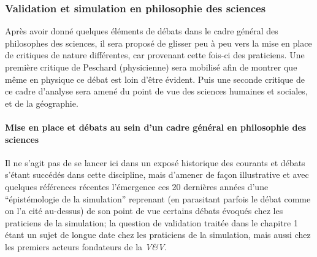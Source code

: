 \subsubsection{Validation et simulation en philosophie des sciences}
\label{sssec:philo_sciences}


Après avoir donné quelques éléments de débats dans le cadre général des philosophes des sciences, il sera proposé de glisser peu à peu vers la mise en place de critiques de nature différentes, car provenant cette fois-ci des praticiens. Une première critique de Peschard (physicienne) \autocite{Peschard2013} sera mobilisé afin de montrer que même en physique ce débat est loin d'être évident. Puis une seconde critique de ce cadre d'analyse sera amené du point de vue des sciences humaines et sociales, et de la géographie.

\paragraph{Mise en place et débats au sein d'un cadre général en philosophie des sciences}


Il ne s'agit pas de se lancer ici dans un exposé historique des courants et débats s'étant succédés dans cette discipline, mais d'amener de façon illustrative et avec quelques références récentes l'émergence ces 20 dernières années d'une \enquote{épistémologie de la simulation} reprenant (en parasitant parfois le débat comme on l'a cité au-dessus) de son point de vue certains débats évoqués chez les praticiens de la simulation; la question de validation traitée dans le chapitre 1 étant un sujet de longue date chez les praticiens de la simulation, mais aussi chez les premiers acteurs fondateurs de la \textit{V\&V}. 

